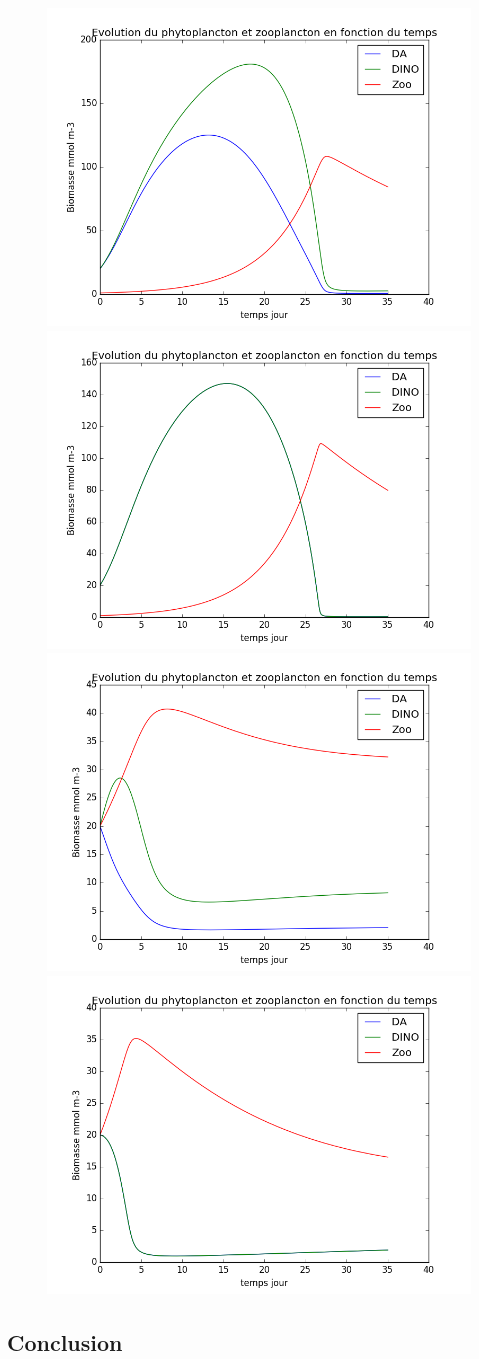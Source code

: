 \begin{figure}
  \includegraphics[width=.5\textwidth]{partie2/test3sel.png}\hfill
  \includegraphics[width=.5\textwidth]{partie2/test3nonsel.png}\\
  \includegraphics[width=.5\textwidth]{partie2/test4sel.png}\hfill
  \includegraphics[width=.5\textwidth]{partie2/test4nonsel.png}
  \caption{\todo}
  \label{fig:partie2Test2}
\end{figure}

\subsection{Conclusion}

